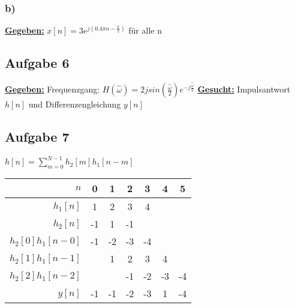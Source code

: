 \documentclass[12pt]{scrreprt}
\begin{document}
\subsubsection*{b)}
\underline{\textbf{Gegeben:}}\newline
\hspace*{5mm}$x[n]=3e^{j(0.4\pi n - \frac{\pi}{2})}$ für alle n\newline
\hspace*{5mm}

\subsection*{Aufgabe 6}
\underline{\textbf{Gegeben:}}\newline
\hspace*{5mm}Frequenzgang: $H(\hat{\omega})=2jsin(\frac{\hat{\omega}}{2})e^{-j\frac{\hat{\omega}}{2}}$\newline
\underline{\textbf{Gesucht:}}\newline
\hspace*{5mm}Impulsantwort $h[n]$ und Differenzengleichung $y[n]$\newline

\subsection*{Aufgabe 7}
\hspace*{5mm}$h[n]=\sum_{m=0}^{N-1}h_2[m]h_1[n-m]$\newline
\newline
\begin{tabular}{r|cccccc}
$n$ 				&  0  &  1  &  2  & 3   &  4  & 5 \\\hline
$h_1[n]$			&  1  &  2  &  3  & 4   &     &   \\
$h_2[n]$			& -1  &  1  & -1  &     &     &   \\\hline
$h_2[0]h_1[n-0]$	& -1  & -2  & -3  & -4  &     &   \\
$h_2[1]h_1[n-1]$	&     &  1  &  2  &  3  &  4  &   \\
$h_2[2]h_1[n-2]$	&     &     & -1  & -2  & -3  & -4\\\hline
$y[n]$              & -1  & -1  & -2  & -3  &  1  & -4\\
\end{tabular}
\end{document}
